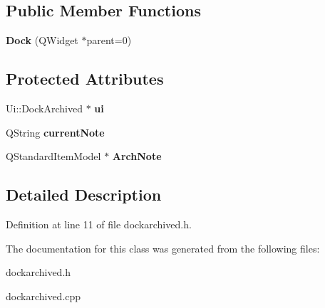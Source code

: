\subsection*{Public Member Functions}
\begin{DoxyCompactItemize}
\item 
\mbox{\label{class_dock_a1e81e2926e94969514ac45a9d839731c}} 
{\bfseries Dock} (Q\+Widget $\ast$parent=0)
\end{DoxyCompactItemize}
\subsection*{Protected Attributes}
\begin{DoxyCompactItemize}
\item 
\mbox{\label{class_dock_a525f557d9a2670640105da2f1e605026}} 
Ui\+::\+Dock\+Archived $\ast$ {\bfseries ui}
\item 
\mbox{\label{class_dock_a6af86621e3df52266a582e464324e6d2}} 
Q\+String {\bfseries current\+Note}
\item 
\mbox{\label{class_dock_a484517393b214e1c3abe0c7b36596172}} 
Q\+Standard\+Item\+Model $\ast$ {\bfseries Arch\+Note}
\end{DoxyCompactItemize}


\subsection{Detailed Description}


Definition at line 11 of file dockarchived.\+h.



The documentation for this class was generated from the following files\+:\begin{DoxyCompactItemize}
\item 
dockarchived.\+h\item 
dockarchived.\+cpp\end{DoxyCompactItemize}
